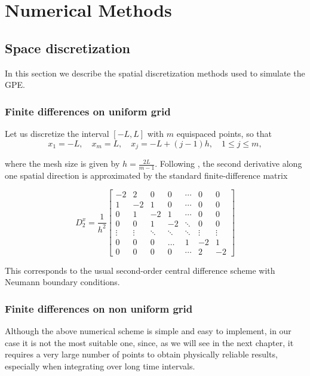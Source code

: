 \chapter{Numerical Methods}

\section{Space discretization}

In this section we describe the spatial discretization methods used to simulate the GPE.

\subsection{Finite differences on uniform grid}

Let us discretize the interval $[-L, L]$ with $m$ equispaced points, so that 
\[
    x_1 = -L, \quad x_m = L, \quad x_j = -L + (j-1)h, \quad 1 \leq j \leq m,
\]

where the mesh size is given by $h = \tfrac{2L}{m-1}$.  
Following \cite{dispenseCaliari}, the second derivative along one spatial direction is approximated by the standard finite-difference matrix

\[
    D_{2}^x = \frac{1}{h^2}
    \begin{bmatrix}
        -2 & 2  & 0  & 0  & \cdots & 0  & 0 \\
        1 & -2 & 1  & 0  & \cdots & 0  & 0 \\
        0 &  1 & -2 & 1  & \cdots & 0  & 0 \\
        0 &  0 &  1 & -2 & \ddots & 0  & 0 \\
        \vdots & \vdots & \ddots & \ddots & \ddots & \vdots & \vdots \\
        0 &  0 &  0 &  \dots & 1 & -2 & 1 \\
        0 &  0 &  0 &  0 & \cdots &  2 & -2
    \end{bmatrix}
\]

This corresponds to the usual second-order central difference scheme with Neumann boundary conditions. 

\subsection{Finite differences on non uniform grid}
\label{sb:nufg}

Although the above numerical scheme is simple and easy to implement, in our case it is not the most suitable one, since, as we will see in the next chapter, it requires a very large number of points to obtain physically reliable results, especially when integrating over long time intervals.  

